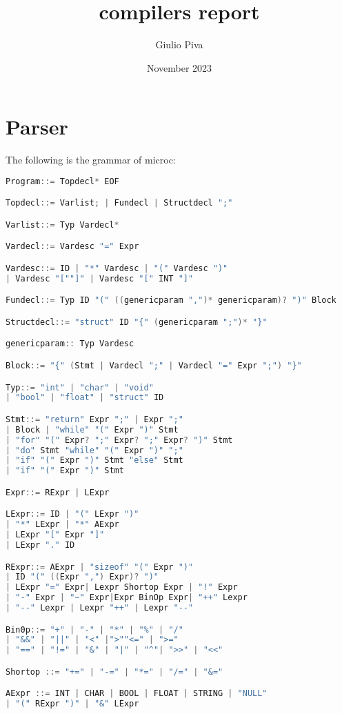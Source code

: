 \documentclass{article}
\title{compilers report}
\author{Giulio Piva}
\date{November 2023}
\begin{document}
\maketitle


\section{Parser}
The following is the grammar of microc:
\begin{adjustbox}{margin=-7cm 0cm 0cm 0cm}
\begin{lstlisting}[language=C, basicstyle=\ttfamily\fontsize{8pt}{14pt}, keywordstyle=\color{blue}, commentstyle=\color{green}]
Program::= Topdecl* EOF

Topdecl::= Varlist; | Fundecl | Structdecl ";"

Varlist::= Typ Vardecl*

Vardecl::= Vardesc "=" Expr

Vardesc::= ID | "*" Vardesc | "(" Vardesc ")"
| Vardesc "[""]" | Vardesc "[" INT "]"

Fundecl::= Typ ID "(" ((genericparam ",")* genericparam)? ")" Block

Structdecl::= "struct" ID "{" (genericparam ";")* "}"

genericparam:: Typ Vardesc

Block::= "{" (Stmt | Vardecl ";" | Vardecl "=" Expr ";") "}"

Typ::= "int" | "char" | "void"
| "bool" | "float" | "struct" ID

Stmt::= "return" Expr ";" | Expr ";"
| Block | "while" "(" Expr ")" Stmt
| "for" "(" Expr? ";" Expr? ";" Expr? ")" Stmt
| "do" Stmt "while" "(" Expr ")" ";"
| "if" "(" Expr ")" Stmt "else" Stmt
| "if" "(" Expr ")" Stmt

Expr::= RExpr | LExpr

LExpr::= ID | "(" LExpr ")"
| "*" LExpr | "*" AExpr
| LExpr "[" Expr "]"
| LExpr "." ID

RExpr::= AExpr | "sizeof" "(" Expr ")"
| ID "(" ((Expr ",") Expr)? ")"
| LExpr "=" Expr| Lexpr Shortop Expr | "!" Expr
| "-" Expr | "~" Expr|Expr BinOp Expr| "++" Lexpr
| "--" Lexpr | Lexpr "++" | Lexpr "--"

Bin0p::= "+" | "-" | "*" | "%" | "/"
| "&&" | "||" | "<" |">""<=" | ">="
| "==" | "!=" | "&" | "|" | "^"| ">>" | "<<"

Shortop ::= "+=" | "-=" | "*=" | "/=" | "&="

AExpr ::= INT | CHAR | BOOL | FLOAT | STRING | "NULL"
| "(" RExpr ")" | "&" LExpr
\end{lstlisting}
\end{adjustbox}
\end{document}
